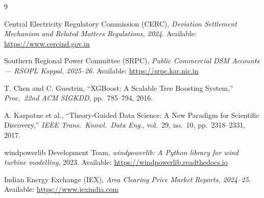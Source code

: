 \documentclass[12pt,a4paper]{report}
\begin{document}
\begin{thebibliography}{9}

Central Electricity Regulatory Commission (CERC),
\textit{Deviation Settlement Mechanism and Related Matters Regulations, 2024}.
Available: \url{https://www.cercind.gov.in}

Southern Regional Power Committee (SRPC),
\textit{Public Commercial DSM Accounts --- RSOPL Koppal, 2025--26}.
Available: \url{https://srpc.kar.nic.in}

T. Chen and C. Guestrin,
``XGBoost: A Scalable Tree Boosting System,''
\textit{Proc.\ 22nd ACM SIGKDD}, pp.\ 785--794, 2016.

A. Karpatne et al.,
``Theory-Guided Data Science: A New Paradigm for Scientific Discovery,''
\textit{IEEE Trans.\ Knowl.\ Data Eng.}, vol.\ 29, no.\ 10, pp.\ 2318--2331, 2017.

windpowerlib Development Team,
\textit{windpowerlib: A Python library for wind turbine modelling}, 2023.
Available: \url{https://windpowerlib.readthedocs.io}

Indian Energy Exchange (IEX),
\textit{Area Clearing Price Market Reports, 2024--25}.
Available: \url{https://www.iexindia.com}

\end{thebibliography}
\end{document}
